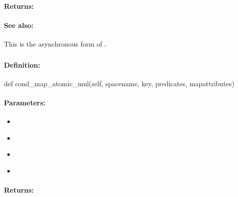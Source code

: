 \paragraph{Returns:}


\paragraph{See also:}  This is the asynchronous form of .

\pagebreak
\subsubsection{}
\label{api:python:cond_map_atomic_mul}


\paragraph{Definition:}
\begin{pythoncode}
def cond_map_atomic_mul(self, spacename, key, predicates, mapattributes)
\end{pythoncode}

\paragraph{Parameters:}
\begin{itemize}[noitemsep]
\item {}\\

\item {}\\

\item {}\\

\item {}\\

\end{itemize}

\paragraph{Returns:}


